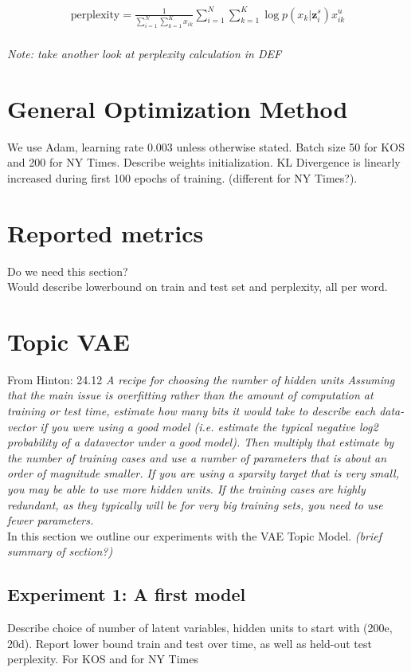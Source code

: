 \documentclass{report}
\begin{document}
	
	\begin{align}
	\text{perplexity} =  \frac{1}{\sum\limits_{i=1}^{N}\sum\limits_{k=1}^{K}x_{ik}}\sum\limits_{i=1}^N\sum\limits_{k=1}^{K} \log p(x_{k}|\mathbf{z}_{i}^{s})x_{ik}^{u}
	\end{align}\\
	\textit{Note: take another look at perplexity calculation in DEF}
	
	\section{General Optimization Method}
	We use Adam, learning rate 0.003 unless otherwise stated. Batch size 50 for KOS and 200 for NY Times. Describe weights initialization. KL Divergence is linearly increased during first 100 epochs of training. (different for NY Times?).
	
	\section{Reported metrics}
	Do we need this section?
	\\ 
	Would describe lowerbound on train and test set and perplexity, all per word.
	
	\section{Topic VAE}
	
	From Hinton: 24.12 \textit{A recipe for choosing the number of hidden units
		Assuming that the main issue is overfitting rather than the amount of computation at training or
		test time, estimate how many bits it would take to describe each data-vector if you were using a good
		model (i.e. estimate the typical negative log2 probability of a datavector under a good model). Then
		multiply that estimate by the number of training cases and use a number of parameters that is about
		an order of magnitude smaller. If you are using a sparsity target that is very small, you may be able
		to use more hidden units. If the training cases are highly redundant, as they typically will be for very
		big training sets, you need to use fewer parameters.}\\

	In this section we outline our experiments with the VAE Topic Model. \textit{(brief summary of section?)} 
	
	
	
	\subsection{Experiment 1: A first model}
	Describe choice of number of latent variables, hidden units to start with (200e, 20d). Report lower bound train and test over time, as well as held-out test perplexity. For KOS and for NY Times
	
\end{document}
